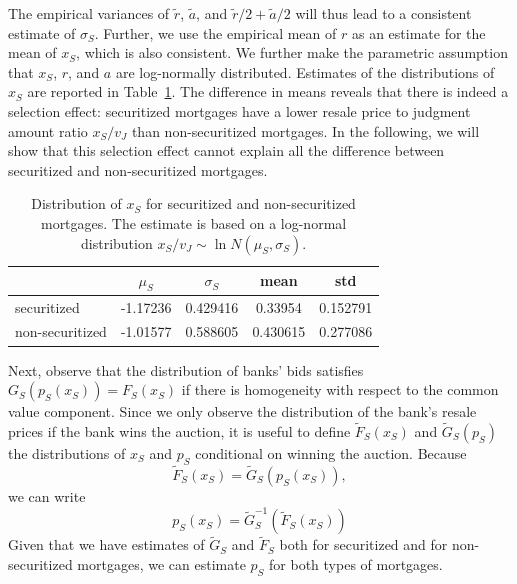\documentclass[11pt,twopage]{article}
\begin{document}
The empirical variances of $\tilde r$, $\tilde a$, and $\tilde
r/2+\tilde a/2$ will thus lead to a consistent estimate of
$\sigma_S$. Further, we use the empirical mean of $r$ as an estimate
for the mean of $x_S$, which is also consistent. We further make the
parametric assumption that $x_S$, $r$, and $a$ are log-normally
distributed. Estimates of the distributions of $x_S$ are reported in
Table~\ref{tab:xs}. The difference in means reveals that there is
indeed a selection effect: securitized mortgages have a lower resale
price to judgment amount ratio $x_S/v_J$ than non-securitized
mortgages. In the following, we will show that this selection effect
cannot explain all the difference between securitized and
non-securitized mortgages.

\begin{table}
  \begin{center}
    \begin{tabular}{l|cc||cc}
      & $\mu_S$ & $\sigma_S$ & mean & std \\
      \hline
      securitized & -1.17236 & 0.429416 & 0.33954 & 0.152791 \\
      non-securitized & -1.01577 & 0.588605 & 0.430615 & 0.277086
    \end{tabular}
    \caption{Distribution of $x_S$ for securitized and non-securitized
      mortgages. The estimate is based on a log-normal distribution
      $x_S/v_J\sim \ln N(\mu_S,\sigma_S)$.\label{tab:xs}}
  \end{center}
\end{table}


Next, observe that the distribution of banks' bids satisfies
$G_S(p_S(x_S))=F_S(x_S)$ if there is homogeneity with respect to the
common value component. Since we only observe the distribution of the
bank's resale prices if the bank wins the auction, it is useful to
define $\tilde F_S(x_S)$ and $\tilde G_S(p_S)$ the distributions of
$x_S$ and $p_S$ conditional on winning the auction.
Because \[ \tilde F_S(x_S) =\tilde G_S(p_S(x_S)), \]we can write
\[
p_S(x_S) = \tilde G_S^{-1}(\tilde F_S(x_S))
\]
Given that we have estimates of $\tilde G_S$ and $\tilde F_S$ both for
securitized and for non-securitized mortgages, we can estimate $p_S$
for both types of mortgages.

\end{document}
